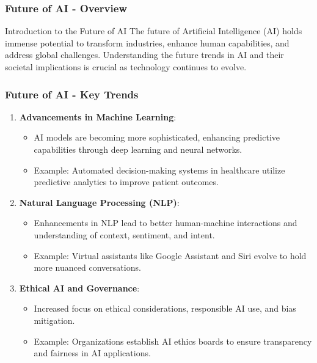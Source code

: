 \documentclass[aspectratio=169]{beamer}
\begin{document}
\begin{frame}[fragile]
    \frametitle{Future of AI - Overview}
    \begin{block}{Introduction to the Future of AI}
        The future of Artificial Intelligence (AI) holds immense potential to transform industries, enhance human capabilities, and address global challenges. Understanding the future trends in AI and their societal implications is crucial as technology continues to evolve.
    \end{block}
\end{frame}

\begin{frame}[fragile]
    \frametitle{Future of AI - Key Trends}
    \begin{enumerate}
        \item \textbf{Advancements in Machine Learning}:
            \begin{itemize}
               \item AI models are becoming more sophisticated, enhancing predictive capabilities through deep learning and neural networks.
               \item Example: Automated decision-making systems in healthcare utilize predictive analytics to improve patient outcomes.
            \end{itemize}
            
        \item \textbf{Natural Language Processing (NLP)}:
            \begin{itemize}
               \item Enhancements in NLP lead to better human-machine interactions and understanding of context, sentiment, and intent.
               \item Example: Virtual assistants like Google Assistant and Siri evolve to hold more nuanced conversations.
            \end{itemize}
            
        \item \textbf{Ethical AI and Governance}:
            \begin{itemize}
                \item Increased focus on ethical considerations, responsible AI use, and bias mitigation.
                \item Example: Organizations establish AI ethics boards to ensure transparency and fairness in AI applications.
            \end{itemize}


\end{enumerate}
\end{frame}
\end{document}
